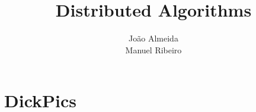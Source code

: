 \documentclass{tudelft-report}
\begin{document}
\frontmatter

\title[Implementation of Election in Asynchronous Complete Networks]{Distributed Algorithms}
\author{Jo\~ao Almeida\\Manuel Ribeiro}







\mainmatter



\chapter{DickPics}
\end{document}
